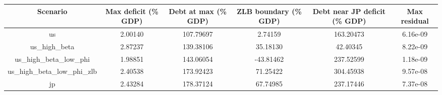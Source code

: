 \begin{table}[!ht]
\setlength\tabcolsep{0.425em}
\setlength\aboverulesep{0pt}
\setlength\belowrulesep{0.2em}
\centering
\begin{threeparttable}
\begin{tabular}{cccccc}
\toprule[0.1em]
Scenario & Max deficit (\% GDP) & Debt at max (\% GDP) & ZLB boundary (\% GDP) & Debt near JP deficit (\% GDP) & Max residual \\[0.2em]
\midrule[0.075em]
us & 2.00140 & 107.79697 & 2.74159 & 163.20473 & 6.16e-09 \\[0.2em]
us\_high\_beta & 2.87237 & 139.38106 & 35.18130 & 42.40345 & 8.22e-09 \\[0.2em]
us\_high\_beta\_low\_phi & 1.98851 & 143.06054 & -43.81462 & 237.52599 & 1.18e-09 \\[0.2em]
us\_high\_beta\_low\_phi\_zlb & 2.40538 & 173.92423 & 71.25422 & 304.45938 & 9.57e-08 \\[0.2em]
jp & 2.43284 & 178.37124 & 67.74985 & 237.17446 & 7.37e-08 \\[0.2em]
\bottomrule[0.1em]
\end{tabular}
\end{threeparttable}
\end{table}
